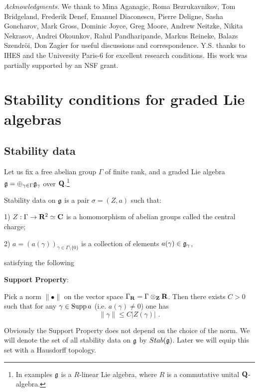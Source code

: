 \documentclass[12pt]{article}
\begin{document}
{\it Acknowledgments.}  We thank to Mina Aganagic, Roma Bezrukavnikov, Tom Bridgeland, Frederik Denef, Emanuel Diaconescu, Pierre Deligne,  Sasha Goncharov, Mark Gross, Dominic Joyce, Greg Moore, Andrew Neitzke, Nikita Nekrasov, Andrei Okounkov, Rahul Pandharipande, Markus Reineke, Balazs Szendr\"oi, Don Zagier  for useful discussions and correspondence.  Y.S. thanks to IHES and the University Paris-6 for excellent research conditions.
His work was partially supported by an NSF grant.


\section{Stability conditions for graded Lie algebras}

\subsection{Stability data}

Let us fix a free abelian group $\Gamma$ of finite rank,
and a graded Lie algebra ${\mathfrak g}=\oplus_{\gamma\in \Gamma}{\mathfrak g}_{\gamma}$ over ${\bf Q}$.\footnote{In examples ${\mathfrak g}$ is a $R$-linear Lie algebra, where $R$ is a commutative unital ${\bf Q}$-algebra.}

\begin{defn} Stability data on ${\mathfrak g}$ is a pair
$\sigma=(Z,a)$ such that:

1) $Z: \Gamma\to {\bf R}^2\simeq {\bf C}$ is a homomorphism of abelian groups called the central charge;

2) $a=(a(\gamma))_{\gamma\in \Gamma\setminus \{0\}}$ is a collection of elements $a(\gamma)\in {\mathfrak g}_{\gamma}$,

satisfying the following

\vspace{2mm}

{\bf Support Property}:
\vspace{2mm}

Pick a  norm $\parallel\bullet\parallel$ on the vector space $\Gamma_{{\bf R}}=\Gamma\otimes_{{\bf Z}}{\bf R}$.
Then there exists $C>0$ such that for any $\gamma\in \operatorname{Supp}a $ (i.e. $a(\gamma)\ne 0$) one has
$$\parallel\gamma\parallel\le C|Z(\gamma)|\,\,.$$


\end{defn}

Obviously the Support Property does not depend on the choice of the norm. We will denote the set of all stability
data on ${\mathfrak g}$ by $Stab({\mathfrak g})$. Later we will equip this set with a Hausdorff topology.
\end{document}
